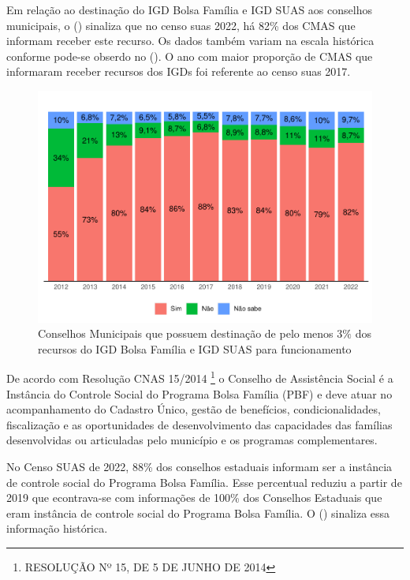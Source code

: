 \documentclass[
  brazilian]{report}
\begin{document}
Em relação ao destinação do IGD Bolsa Família e IGD SUAS aos conselhos
municipais, o () sinaliza que no censo
suas 2022, há 82\% dos CMAS que informam receber este recurso. Os dados
também variam na escala histórica conforme pode-se obserdo no
(). O ano com maior proporção de CMAS que informaram
receber recursos dos IGDs foi referente ao censo suas 2017.

\begin{figure}
\includegraphics{Censo-SUAS-2022_files/figure-latex/cmas_igd-1} \caption[Conselhos Municipais que possuem destinação de pelo menos 3$\%$ dos recursos do IGD Bolsa Família e IGD SUAS para funcionamento]{Conselhos Municipais que possuem destinação de pelo menos 3$\%$ dos recursos do IGD Bolsa Família e IGD SUAS para funcionamento}\label{fig:cmas_igd}
\end{figure}

De acordo com Resolução CNAS 15/2014
\footnote{RESOLUÇÃO Nº 15, DE 5 DE JUNHO DE 2014} o Conselho de
Assistência Social é a Instância do Controle Social do Programa Bolsa
Família (PBF) e deve atuar no acompanhamento do Cadastro Único, gestão
de benefícios, condicionalidades, fiscalização e as oportunidades de
desenvolvimento das capacidades das famílias desenvolvidas ou
articuladas pelo município e os programas complementares.

No Censo SUAS de 2022, 88\% dos conselhos estaduais informam ser a
instância de controle social do Programa Bolsa Família. Esse percentual
reduziu a partir de 2019 que econtrava-se com informações de 100\% dos
Conselhos Estaduais que eram instância de controle social do Programa
Bolsa Família. O () sinaliza essa informação
histórica.
\end{document}
